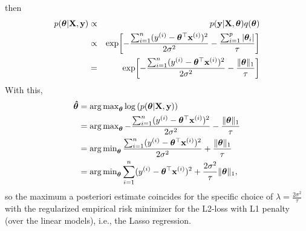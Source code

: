 \documentclass[a4paper]{article}
\begin{document}
{\begin{enumerate}
	  	then 
%	
	\begin{eqnarray*}
		p(\bm{\theta} | \mathbf{X}, \mathbf{y}) &\propto& p(\mathbf{y} | \mathbf{X}, \bm{\theta}) q(\bm{\theta}) \\
		&\propto& \exp\biggl[-\frac{ \sum_{i=1}^n (y^{(i)} - \bm{\theta}^\top \mathbf{x}^{(i)})^2}{2\sigma^2} -\frac{\sum_{i=1}^p |\bm{\theta}_i|}{\tau}  \biggr] \\
		&=& \exp\biggl[-\frac{ \sum_{i=1}^n (y^{(i)} - \bm{\theta}^\top \mathbf{x}^{(i)})^2}{2\sigma^2} -\frac{\|\bm{\theta}\|_1}{\tau}  \biggr]
	\end{eqnarray*}
	With this, 
	\begin{align*}
		\bm{\hat\theta} 
		&= \operatorname{arg\,max}_{\bm{\theta}} \log \left( p(\bm{\theta} | \mathbf{X}, \mathbf{y}) \right) \\
		&= \operatorname{arg\,max}_{\bm{\theta}} -\frac{ \sum_{i=1}^n (y^{(i)} - \bm{\theta}^\top \mathbf{x}^{(i)})^2}{2\sigma^2} -\frac{\|\bm{\theta}\|_1}{\tau}   \\
		&= \operatorname{arg\,min}_{\bm{\theta}}  \frac{ \sum_{i=1}^n (y^{(i)} - \bm{\theta}^\top \mathbf{x}^{(i)})^2}{2\sigma^2} + \frac{\|\bm{\theta}\|_1}{\tau}  \\
		&= \operatorname{arg\,min}_{\bm{\theta}}   \sum_{i=1}^n (y^{(i)} - \bm{\theta}^\top \mathbf{x}^{(i)})^2  + \frac{2\sigma^2}{ \tau}  \|\bm{\theta}\|_1   ,
	\end{align*}
	so the  maximum a posteriori estimate coincides for the specific choice of $\lambda = \frac{2\sigma^2}{ \tau}$ with the regularized empirical risk minimizer for the L2-loss with L1 penalty (over the linear models), i.e., the Lasso regression.
%	
\end{enumerate}
%
}
\end{document}
